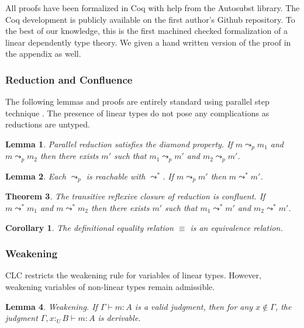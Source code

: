 \documentclass[sigplan,screen,review,authordraft]{acmart}
\newtheorem{theorem}{Theorem}[section]
\newtheorem{corollary}{Corollary}[theorem]
\newtheorem{lemma}[theorem]{Lemma}
\theoremstyle{definition}
\newcommand{\utype}{:_{\scriptscriptstyle U}}
\newcommand{\step}{\leadsto}
\newcommand{\pstep}{\leadsto}
\begin{document}
  All proofs have been formalized in Coq with help from the Autosubst \cite{autosubst} library. The Coq development is publicly available on the first author's Github repository. To the best of our knowledge, this is the first machined checked formalization of a linear dependently type theory. We given a hand written version of the proof in the appendix as well.

  \subsubsection{Reduction and Confluence}

  The following lemmas and proofs are entirely standard using parallel step technique \cite{takahashi}. The presence of linear types do not pose any complications as reductions are untyped.

  \begin{lemma} 
    Parallel reduction satisfies the diamond property. If $m \pstep_p m_1$ and $m \pstep_p m_2$ then there exists $m'$ such that $m_1 \pstep_p m'$ and $m_2 \pstep_p m'$.
  \end{lemma}

  \begin{lemma} 
    Each $\pstep_p$ is reachable with $\step^*$. If $m \pstep_p m'$ then $m \step^* m'$.
  \end{lemma}

  \begin{theorem} 
    The transitive reflexive closure of reduction is confluent. If $m \step^* m_1$ and $m \step^* m_2$ then there exists $m'$ such that $m_1 \pstep^* m'$ and $m_2 \pstep^* m'$.
  \end{theorem}

  \begin{corollary}
    The definitional equality relation $\equiv$ is an equivalence relation.
  \end{corollary}

  \subsubsection{Weakening} \label{weakening}
  CLC restricts the weakening rule for variables of linear types. However, weakening variables of non-linear types remain admissible.

  \begin{lemma} 
    Weakening. If $\Gamma \vdash m : A$ is a valid judgment, then for any $x \notin \Gamma$, the judgment $\Gamma, x \utype B \vdash m : A$ is derivable.
  \end{lemma}
\end{document}
